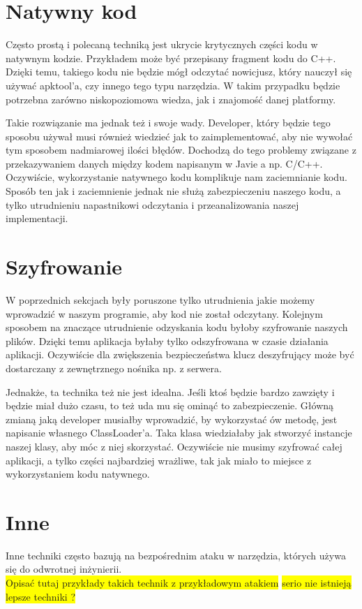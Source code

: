 \documentclass[12pt,a4paper,leqno,oneside,titlepage]{book}
\newcommand{\todo}[1]{\colorbox{yellow}{#1}}
\begin{document}
\section{Natywny kod}
Często prostą i polecaną techniką jest ukrycie krytycznych części kodu w natywnym kodzie. Przykładem może być przepisany fragment kodu do C++. Dzięki temu, takiego kodu nie będzie mógł odczytać nowicjusz, który nauczył się używać apktool'a, czy innego tego typu narzędzia. W takim przypadku będzie potrzebna zarówno niskopoziomowa wiedza, jak i znajomość danej platformy.\par
Takie rozwiązanie ma jednak też i swoje wady. Developer, który będzie tego sposobu używał musi również wiedzieć jak to zaimplementować, aby nie wywołać tym sposobem nadmiarowej ilości błędów. Dochodzą do tego problemy związane z przekazywaniem danych między kodem napisanym w Javie a np. C/C++. Oczywiście, wykorzystanie natywnego kodu komplikuje nam zaciemnianie kodu. Sposób ten jak i zaciemnienie jednak nie służą zabezpieczeniu naszego kodu, a tylko utrudnieniu napastnikowi odczytania i przeanalizowania naszej implementacji.
\section{Szyfrowanie}
W poprzednich sekcjach były poruszone tylko utrudnienia jakie możemy wprowadzić w naszym programie, aby kod nie został odczytany. Kolejnym sposobem na znaczące utrudnienie odzyskania kodu byłoby szyfrowanie naszych plików. Dzięki temu aplikacja byłaby tylko odszyfrowana w czasie działania aplikacji. Oczywiście dla zwiększenia bezpieczeństwa klucz deszyfrujący może być dostarczany z zewnętrznego nośnika np. z serwera.
\par
Jednakże, ta technika też nie jest idealna. Jeśli ktoś będzie bardzo zawzięty i będzie miał dużo czasu, to też uda mu się ominąć to zabezpieczenie. Główną zmianą jaką developer musiałby wprowadzić, by wykorzystać ów metodę, jest napisanie własnego ClassLoader'a. Taka klasa wiedziałaby jak stworzyć instancje naszej klasy, aby móc z niej skorzystać. Oczywiście nie musimy szyfrować całej aplikacji, a tylko części najbardziej wrażliwe, tak jak miało to miejsce z wykorzystaniem kodu natywnego.
%
\section{Inne}
Inne techniki często bazują na bezpośrednim ataku w narzędzia, których używa się do odwrotnej inżynierii.
\\
\todo{Opisać tutaj przykłady takich technik z przykładowym atakiem}
\todo{serio nie istnieją lepsze techniki ?}
%
\end{document}
